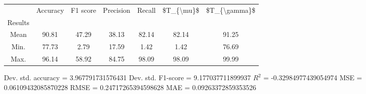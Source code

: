 \begin{tabular}{|c|c|c|c|c|c|c|}
\toprule
{} &  Accuracy &  F1 score &  Precision &  Recall &  \$T\_\{\textbackslash mu\}\$ &  \$T\_\{\textbackslash gamma\}\$ \\
Results &           &           &            &         &            &               \\
\hline
Mean    &     90.81 &     47.29 &      38.13 &   82.14 &      82.14 &         91.25 \\
Min.    &     77.73 &      2.79 &      17.59 &    1.42 &       1.42 &         76.69 \\
Max.    &     96.14 &     58.92 &      84.75 &   98.09 &      98.09 &         99.99 \\
\bottomrule
\end{tabular}

 Dev. std. accuracy = 3.967791731576431
 Dev. std. F1-score = 9.177037711899937
 $R^2$ = -0.32984977439054974
 MSE = 0.06109432085870228
 RMSE = 0.24717265394598628
 MAE = 0.09263372859353526